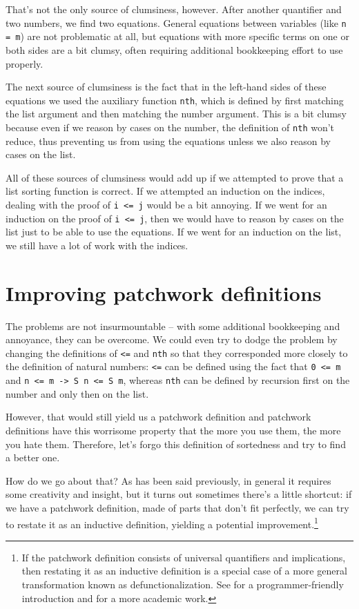 \documentclass[declaration,mgr,english,shortabstract]{iithesis}
\newcommand{\m}[1]{\texttt{#1}}
\begin{document}
That's not the only source of clumsiness, however. After another quantifier and two numbers, we find two equations. General equations between variables (like \m{n = m}) are not problematic at all, but equations with more specific terms on one or both sides are a bit clumsy, often requiring additional bookkeeping effort to use properly.

The next source of clumsiness is the fact that in the left-hand sides of these equations we used the auxiliary function \m{nth}, which is defined by first matching the list argument and then matching the number argument. This is a bit clumsy because even if we reason by cases on the number, the definition of \m{nth} won't reduce, thus preventing us from using the equations unless we also reason by cases on the list.

All of these sources of clumsiness would add up if we attempted to prove that a list sorting function is correct. If we attempted an induction on the indices, dealing with the proof of \m{i <= j} would be a bit annoying. If we went for an induction on the proof of \m{i <= j}, then we would have to reason by cases on the list just to be able to use the equations. If we went for an induction on the list, we still have a lot of work with the indices.

\section{Improving patchwork definitions} \label{improvingpatchwork}

The problems are not insurmountable -- with some additional bookkeeping and annoyance, they can be overcome. We could even try to dodge the problem by changing the definitions of \m{<=} and \m{nth} so that they corresponded more closely to the definition of natural numbers: \m{<=} can be defined using the fact that \m{0 <= m} and \m{n <= m -> S n <= S m}, whereas \m{nth} can be defined by recursion first on the number and only then on the list.

However, that would still yield us a patchwork definition and patchwork definitions have this worrisome property that the more you use them, the more you hate them. Therefore, let's forgo this definition of sortedness and try to find a better one.

How do we go about that? As has been said previously, in general it requires some creativity and insight, but it turns out sometimes there's a little shortcut: if we have a patchwork definition, made of parts that don't fit perfectly, we can try to restate it as an inductive definition, yielding a potential improvement.\footnote{If the patchwork definition consists of universal quantifiers and implications, then restating it as an inductive definition is a special case of a more general transformation known as defunctionalization. See \cite{DefunctionalizationLight} for a programmer-friendly introduction and \cite{DefunctionalizationSerious} for a more academic work.}
\end{document}
